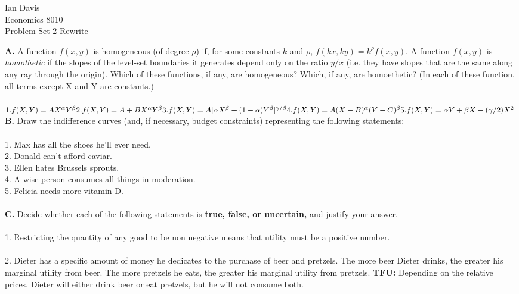 \documentclass[11pt]{article}
\begin{document}
\begin{flushleft}
Ian Davis\\
Economics 8010\\
Problem Set 2 Rewrite\\
\end{flushleft}
\textbf{A.} A function $f(x,y)$ is homogeneous (of degree $\rho$) if, for some constants $k$ and $\rho$, $f(kx,ky) = k^\rho f(x,y)$. A function $f(x,y)$ is \textit{homothetic} if the slopes of the level-set boundaries it generates depend only on the ratio $y/x$ (i.e. they have slopes that are the same along any ray through the origin). Which of these functions, if any, are homogeneous? Which, if any, are homoethetic? (In each of these function, all terms except X and Y are constants.)\\
\\
$1. f(X,Y) = AX^\alpha Y^\beta\\
2. f(X,Y) = A + BX^\alpha Y^\beta \\
3. f(X,Y) = A[\alpha X^\beta + (1-\alpha )Y^\beta ]^{\gamma /\beta}\\
4. f(X,Y) = A(X-B)^\alpha (Y-C)^\beta\\
5. f(X,Y) = \alpha Y + \beta X - (\gamma /2)X^2\\\
$\\
\textbf{B.} Draw the indifference curves (and, if necessary, budget constraints) representing the following statements:\\
\\
1. Max has all the shoes he'll ever need.\\
2. Donald can't afford caviar.\\
3. Ellen hates Brussels sprouts.\\
4. A wise person consumes all things in moderation.\\
5. Felicia needs more vitamin D.\\
\\
\textbf{C.} Decide whether each of the following statements is \textbf{true, false, or uncertain,} and justify your answer.\\
\\
1. Restricting the quantity of any good to be non negative means that utility must be a positive number.\\
\\
2. Dieter has a specific amount of money he dedicates to the purchase of beer and pretzels. The more beer Dieter drinks, the greater his marginal utility from beer. The more pretzels he eats, the greater his marginal utility from pretzels. \textbf{TFU:} Depending on the relative prices, Dieter will either drink beer or eat pretzels, but he will not consume both.\\
\end{document}
